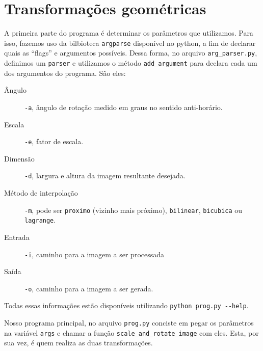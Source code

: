 \documentclass[11pt]{article}
\begin{document}
\section*{Transformações geométricas}
\label{sec:orgfc36f56}
A primeira parte do programa é determinar os parâmetros que utilizamos.
Para isso, fazemos uso da bilbioteca \texttt{argparse} disponível no python, a fim de declarar quais as ``flags'' e argumentos possíveis.
Dessa forma, no arquivo \texttt{arg\_parser.py}, definimos um \texttt{parser} e utilizamos o método \texttt{add\_argument} para declara cada um dos argumentos do programa.
São eles:
\begin{description}
\item[{Ângulo}] \texttt{-a}, ângulo de rotação medido em graus no sentido anti-horário.
\item[{Escala}] \texttt{-e}, fator de escala.
\item[{Dimensão}] \texttt{-d}, largura e altura da imagem resultante desejada.
\item[{Método de interpolação}] \texttt{-m}, pode ser \texttt{proximo} (vizinho mais próximo), \texttt{bilinear}, \texttt{bicubica} ou \texttt{lagrange}.
\item[{Entrada}] \texttt{-i}, caminho para a imagem a ser processada
\item[{Saída}] \texttt{-o}, caminho para a imagem a ser gerada.
\end{description}

Todas essas informações estão disponíveis utilizando \texttt{python prog.py -{}-help}.

Nosso programa principal, no arquivo \texttt{prog.py} conciste em pegar os parâmetros na variável \texttt{args} e chamar a função \texttt{scale\_and\_rotate\_image} com eles.
Esta, por sua vez, é quem realiza as duas transformações.
\end{document}
